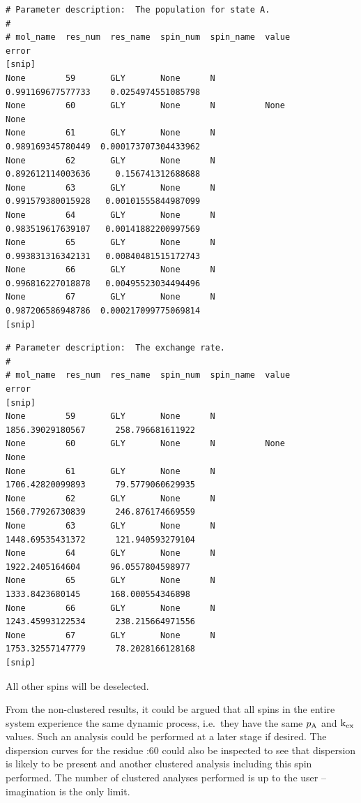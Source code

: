 \begin{lstlisting}[basicstyle=\ttfamily \scriptsize,numbers=none]
# Parameter description:  The population for state A.
#
# mol_name  res_num  res_name  spin_num  spin_name  value                 error                   
[snip]
None        59       GLY       None      N             0.991169677577733    0.0254974551085798    
None        60       GLY       None      N          None                  None                    
None        61       GLY       None      N             0.989169345780449  0.000173707304433962    
None        62       GLY       None      N             0.892612114003636     0.156741312688688    
None        63       GLY       None      N             0.991579380015928   0.00101555844987099    
None        64       GLY       None      N             0.983519617639107   0.00141882200997569    
None        65       GLY       None      N             0.993831316342131   0.00840481515172743    
None        66       GLY       None      N             0.996816227018878   0.00495523034494496    
None        67       GLY       None      N             0.987206586948786  0.000217099775069814    
[snip]
\end{lstlisting}

\begin{lstlisting}[basicstyle=\ttfamily \scriptsize,numbers=none]
# Parameter description:  The exchange rate.
#
# mol_name  res_num  res_name  spin_num  spin_name  value                 error                   
[snip]
None        59       GLY       None      N              1856.39029180567      258.796681611922    
None        60       GLY       None      N          None                  None                    
None        61       GLY       None      N              1706.42820099893      79.5779060629935    
None        62       GLY       None      N              1560.77926730839      246.876174669559    
None        63       GLY       None      N              1448.69535431372      121.940593279104    
None        64       GLY       None      N               1922.2405164604      96.0557804598977    
None        65       GLY       None      N               1333.8423680145      168.000554346898    
None        66       GLY       None      N              1243.45993122534      238.215664971556    
None        67       GLY       None      N              1753.32557147779      78.2028166128168    
[snip]
\end{lstlisting}

All other spins will be deselected.

From the non-clustered results, it could be argued that all spins in the entire system experience the same dynamic process, i.e.\ they have the same $p_{\textrm{A}}$ and $\textrm{k}_{\textrm{ex}}$ values.
Such an analysis could be performed at a later stage if desired.
The dispersion curves for the residue :60 could also be inspected to see that dispersion is likely to be present and another clustered analysis including this spin performed. 
The number of clustered analyses performed is up to the user -- imagination is the only limit.

